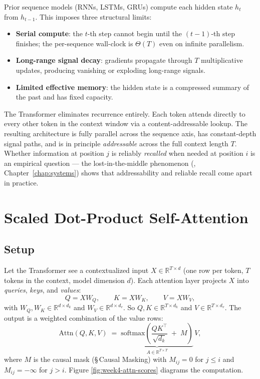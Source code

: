 Prior sequence models (RNNs, LSTMs, GRUs) compute each hidden state
$h_t$ from $h_{t-1}$. This imposes three structural limits:
\begin{itemize}
  \item \textbf{Serial compute}: the $t$-th step cannot begin until the
        $(t-1)$-th step finishes; the per-sequence wall-clock is
        $\Theta(T)$ even on infinite parallelism.
  \item \textbf{Long-range signal decay}: gradients propagate through
        $T$ multiplicative updates, producing vanishing or exploding
        long-range signals.
  \item \textbf{Limited effective memory}: the hidden state is a
        compressed summary of the past and has fixed capacity.
\end{itemize}
The Transformer \citep{vaswani2017attention} eliminates recurrence
entirely. Each token attends directly to every other token in the
context window via a content-addressable lookup. The resulting
architecture is fully parallel across the sequence axis, has
constant-depth signal paths, and is in principle \emph{addressable}
across the full context length $T$. Whether information at position
$j$ is reliably \emph{recalled} when needed at position $i$ is an
empirical question --- the lost-in-the-middle phenomenon
(\citealt{liu2024lost}, Chapter~\ref{chap:systems}) shows that addressability and
reliable recall come apart in practice.

\section{Scaled Dot-Product Self-Attention}

\subsection{Setup}

Let the Transformer see a contextualized input
$X \in \mathbb{R}^{T\times d}$ (one row per token, $T$ tokens in the
context, model dimension $d$). Each attention layer projects $X$ into
\emph{queries}, \emph{keys}, and \emph{values}:
\begin{equation}
\label{eq:ch5-qkv}
Q = X W_Q, \qquad
K = X W_K, \qquad
V = X W_V,
\end{equation}
with $W_Q, W_K \in \mathbb{R}^{d \times d_k}$ and
$W_V \in \mathbb{R}^{d \times d_v}$. So $Q, K \in \mathbb{R}^{T\times d_k}$
and $V \in \mathbb{R}^{T\times d_v}$. The output is a weighted
combination of the value rows:
\begin{equation}
\label{eq:ch5-attn}
\mathrm{Attn}(Q, K, V)
  \;=\; \underbrace{\mathrm{softmax}\!\left(\frac{Q K^{\top}}{\sqrt{d_k}} \;+\; M\right)}_{A \in \mathbb{R}^{T\times T}}\,
        V,
\end{equation}
where $M$ is the causal mask (\S\,Causal Masking) with $M_{ij} = 0$
for $j \le i$ and $M_{ij} = -\infty$ for $j > i$. Figure
\ref{fig:week4-attn-scores} diagrams the computation.

